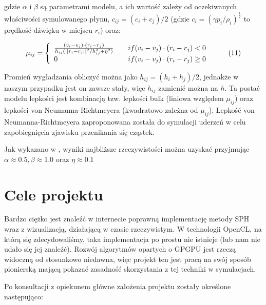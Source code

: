 \documentclass[polish, 12pt]{aghthesis}
\begin{document}
			gdzie $\alpha$ i $\beta$ są parametrami modelu, a ich wartość zależy od oczekiwanych właściwości symulowanego płynu, $c_{ij} = (c_i + c_j) / 2$ (gdzie $c_i = (\gamma p_i / \rho_i)^\frac{1}{2}$ to prędkość dźwięku w miejscu $r_i$) oraz:
			
			\[{\mu}_{ij} = \left\{
				\begin{array}{l l}
					\frac{(v_i - v_j)\cdot(r_i - r_j)}{h_{ij}(||r_i - r_j||^2 / h_{ij}^2 + \eta^2)} & \quad if{(v_i - v_j)\cdot(r_i - r_j) < 0}  \\ 0 & \quad if{(v_i - v_j)\cdot(r_i - r_j) \geq 0} 
				\end{array} \right.\ \label{eq:mu_factor} \tag{11}\]
				
			Promień wygładzania obliczyć można jako $h_{ij} = (h_i + h_j)/2$, jednakże w naszym przypadku jest on zawsze stały, więc $h_{ij}$ zamienić można na $h$. Ta postać modelu lepkości jest kombinacją tzw. lepkości bulk (liniowa względem $\mu_{ij}$) oraz lepkości von Neumanna-Richtmeyera (kwadratowo zależna od $\mu_{ij}$). Lepkość von Neumanna-Richtmeyera zaproponowana została do symulacji uderzeń w celu zapobiegnięcia zjawisku przenikania się cząstek. 
			

			Jak wykazano w \cite{Lombardi}, wyniki najbliższe rzeczywistości można uzyskać przyjmując $\alpha \approx 0.5, \beta \approx 1.0$ oraz $\eta \approx 0.1$

\section{Cele projektu}
\label{sec:cele}

Bardzo ciężko jest znaleźć w internecie poprawną implementację metody SPH wraz z wizualizacją, działającą w czasie rzeczywistym. W technologii OpenCL, na którą się zdecydowaliśmy, taka implementacja po prostu nie istnieje (lub nam nie udało się jej znaleźć). Rozwój algorytmów opartych o GPGPU jest rzeczą widoczną od stosunkowo niedawna, więc projekt ten jest pracą na swój sposób pionierską mającą pokazać zasadność skorzystania z tej techniki w symulacjach.
		
	Po konsultacji z opiekunem główne założenia projektu zostały określone następująco:
	
\end{document}
